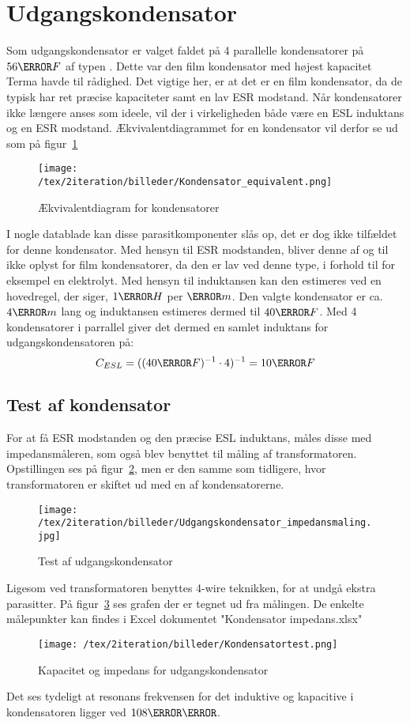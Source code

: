 \section{Udgangskondensator} \label{output_cap}
Som udgangskondensator er valget faldet på 4 parallelle kondensatorer på $56\micro F$ af typen . Dette var den film kondensator med højest kapacitet Terma havde til rådighed. Det vigtige her, er at det er en film kondensator, da de typisk har ret præcise kapaciteter samt en lav ESR modstand. Når kondensatorer ikke længere anses som ideele, vil der i virkeligheden både være en ESL induktans og en ESR modstand. Ækvivalentdiagrammet for en kondensator vil derfor se ud som på figur~\ref{fig: con_equi} 
\begin{figure}[H]
	\center
	\texttt{[image: /tex/2iteration/billeder/Kondensator\_equivalent.png]}
	\caption{Ækvivalentdiagram for kondensatorer
	\cite{ESR}}
	\label{fig: con_equi}
\end{figure}
I nogle datablade kan disse parasitkomponenter slås op, det er dog ikke tilfældet for denne kondensator. Med hensyn til ESR modstanden, bliver denne af og til ikke oplyst for film kondensatorer, da den er lav ved denne type, i forhold til for eksempel en elektrolyt. 
Med hensyn til induktansen kan den estimeres ved en hovedregel, der siger, $1\nano H$ per $\milli m$\cite[p.~38]{rule_of_thumb}. Den valgte kondensator er ca. $4\centi m$ lang og induktansen estimeres dermed til $40\nano F$. Med 4 kondensatorer i parrallel giver det dermed en samlet induktans for udgangskondensatoren på:
\begin{equation} \label{ESL}
C_{ESL} = ((40\nano F)^{-1} \cdot 4)^{-1} = 10\nano F
\end{equation}

\subsection{Test af kondensator}

For at få ESR modstanden og den præcise ESL induktans, måles disse med impedansmåleren, som også blev benyttet til måling af transformatoren. Opstillingen ses på figur~\ref{fig: cap}, men er den samme som tidligere, hvor transformatoren er skiftet ud med en af kondensatorerne. 
\begin{figure}[H]
	\center
	\texttt{[image: /tex/2iteration/billeder/Udgangskondensator\_impedansmaling.jpg]}
	\caption{Test af udgangskondensator}
	\label{fig: cap}
\end{figure}
Ligesom ved transformatoren benyttes 4-wire teknikken, for at undgå ekstra parasitter. På figur~\ref{fig: captest} ses grafen der er tegnet ud fra målingen. De enkelte målepunkter kan findes i Excel dokumentet "Kondensator impedans.xlsx"
\begin{figure}[H]
	\center
	\texttt{[image: /tex/2iteration/billeder/Kondensatortest.png]}
	\caption{Kapacitet og impedans for udgangskondensator}
	\label{fig: captest}
\end{figure}
Det ses tydeligt at resonans frekvensen for det induktive og kapacitive i kondensatoren ligger ved $108\kilo \hertz$. 


